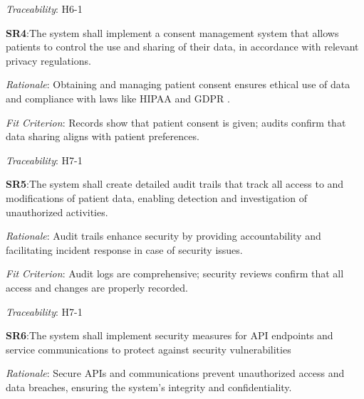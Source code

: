 \documentclass{article}
\begin{document}
\vspace{0.2cm}

\emph{Traceability}: H6-1

\vspace{0.5cm}

\textbf{SR4}:\hypertarget{SR4}{The system shall implement a consent management system that allows patients to control the use and sharing of their data, in accordance with relevant privacy regulations.}
\vspace{0.2cm}

\emph{Rationale}: Obtaining and managing patient consent ensures ethical use of data and compliance with laws like HIPAA \cite{HIPAA} and GDPR \cite{GDPR}.

\vspace{0.2cm}

\emph{Fit Criterion}: Records show that patient consent is given; audits confirm that data sharing aligns with patient preferences.

\vspace{0.2cm}

\emph{Traceability}: H7-1

\vspace{0.5cm}

\textbf{SR5}:\hypertarget{SR5}{The system shall create detailed audit trails that track all access to and modifications of patient data, enabling detection and investigation of unauthorized activities.}
\vspace{0.2cm}

\emph{Rationale}: Audit trails enhance security by providing accountability and facilitating incident response in case of security issues.

\vspace{0.2cm}

\emph{Fit Criterion}: Audit logs are comprehensive; security reviews confirm that all access and changes are properly recorded.

\vspace{0.2cm}

\emph{Traceability}: H7-1

\vspace{0.5cm}

\textbf{SR6}:\hypertarget{SR5}{The system shall implement security measures for API endpoints and service communications to protect against security vulnerabilities}
\vspace{0.2cm}

\emph{Rationale}: Secure APIs and communications prevent unauthorized access and data breaches, ensuring the system's integrity and confidentiality.
\end{document}
